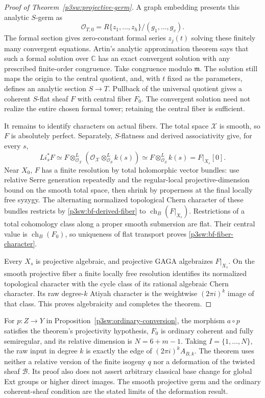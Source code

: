 \documentclass[11pt]{article}
\newcommand{\C}{\mathbb C}
\numberwithin{equation}{section}
\begin{document}
\begin{proof}[Proof of Theorem~\ref{p3sw:projective-germ}]
A graph embedding presents this analytic \(S\)-germ as
\[
 \mathcal O_{T,0}
 =R\{z_1,\ldots,z_h\}/(g_1,\ldots,g_v).
\]
The formal section gives zero-constant formal series \(z_j(t)\)
solving these finitely many convergent equations.  Artin's
analytic approximation theorem
\cite[Theorem~1.2, p.~277]{P3SWArtin1968} says that such a
formal solution over \(\C\) has an exact convergent solution
with any prescribed finite-order congruence.  Take congruence
modulo \(\mathfrak m\).  The solution still maps the origin to
the central quotient, and, with \(t\) fixed as the parameters,
defines an analytic section \(S\to T\).  Pullback of the
universal quotient gives a coherent \(S\)-flat sheaf \(F\)
with central fiber \(F_0\).  The convergent solution need not
realize the entire chosen formal tower; retaining the central
fiber is sufficient.

It remains to identify characters on actual fibers.  The total
space \(\mathcal X\) is smooth, so \(F\) is absolutely perfect.
Separately, \(S\)-flatness and derived associativity give, for
every \(s\),
\begin{equation}
\label{p3sw:bf-derived-fiber}
 Li_s^*F
 \simeq F\otimes^L_{\mathcal O_{\mathcal X}}
       (\mathcal O_{\mathcal X}\otimes^L_{\mathcal O_S}k(s))
 \simeq F\otimes^L_{\mathcal O_S}k(s)
 =F|_{X_s}[0].
\end{equation}
Near \(X_0\), \(F\) has a finite resolution by total holomorphic
vector bundles: use relative Serre generation repeatedly and
the regular-local projective-dimension bound on the smooth
total space, then shrink by properness at the final locally
free syzygy.  The alternating normalized topological Chern
character of these bundles restricts by
\eqref{p3sw:bf-derived-fiber} to
\(\operatorname{ch}_B(F|_{X_s})\).  Restrictions of a total
cohomology class along a proper smooth submersion are flat.
Their central value is \(\operatorname{ch}_B(F_0)\), so
uniqueness of flat transport proves
\eqref{p3sw:bf-fiber-character}.

Every \(X_s\) is projective algebraic, and projective GAGA
algebraizes \(F|_{X_s}\).  On the smooth projective fiber a
finite locally free resolution identifies its normalized
topological character with the cycle class of its rational
algebraic Chern character.  Its raw degree-\(k\) Atiyah
character is the weightwise \((2\pi i)^k\) image of that class.
This proves algebraicity and completes the theorem.
\end{proof}

For \(p:Z\to Y\) in Proposition~\ref{p3sw:ordinary-conversion},
the morphism \(a\circ p\) satisfies the theorem's projectivity
hypothesis, \(F_0\) is ordinary coherent and fully semiregular,
and its relative dimension is \(N=6+m-1\).  Taking
\(I=\{1,\ldots,N\}\), the raw input in degree \(k\) is exactly
the edge of \((2\pi i)^kA_{B,k}\).  The theorem uses neither a
relative version of the finite isogeny \(q\) nor a deformation
of the twisted sheaf \(\mathcal B\).  Its proof also does not
assert arbitrary classical base change for global Ext groups
or higher direct images.  The smooth projective germ and the
ordinary coherent-sheaf condition are the stated limits of the
deformation result.
\end{document}
